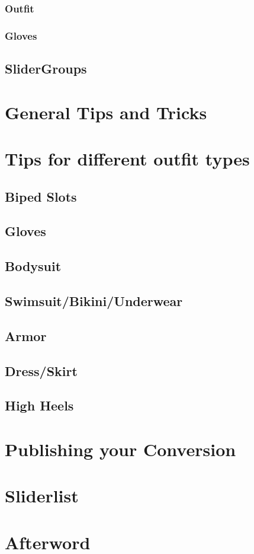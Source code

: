 \documentclass[12pt]{article}
\begin{document}
\subsubsection{Outfit}

\pagebreak
\subsubsection{Gloves}

\pagebreak
\subsection{SliderGroups}

\pagebreak
\section{General Tips and Tricks}

\pagebreak
\section{Tips for different outfit types}
%
\subsection{Biped Slots}

\pagebreak
\subsection{Gloves}

\pagebreak
\subsection{Bodysuit}

\pagebreak
\subsection{Swimsuit/Bikini/Underwear}

\subsection{Armor}

\pagebreak
\subsection{Dress/Skirt}

\pagebreak
\subsection{High Heels}

\pagebreak
\section{Publishing your Conversion}

\pagebreak
\section{Sliderlist}

\pagebreak
\section{Afterword}

\end{document}
